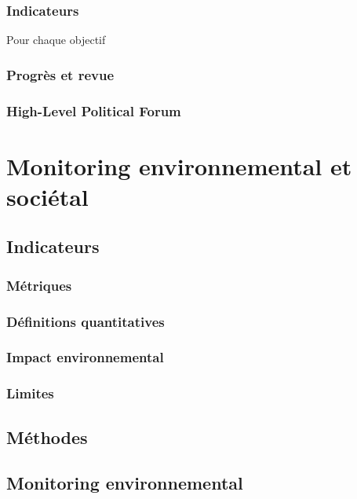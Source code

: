 \documentclass[10pt, conference, compsocconf]{llncs}
\begin{document}
		\subsubsection{Indicateurs}
		Pour chaque objectif
		\subsubsection{Progrès et revue}
		\subsubsection{High-Level Political Forum}

\section{Monitoring environnemental et sociétal}
	\subsection{Indicateurs}
		\subsubsection{Métriques}
		\subsubsection{Définitions quantitatives}
		\subsubsection{Impact environnemental}			
		\subsubsection{Limites}
	\subsection{Méthodes}

	\subsection{Monitoring environnemental}
\end{document}
